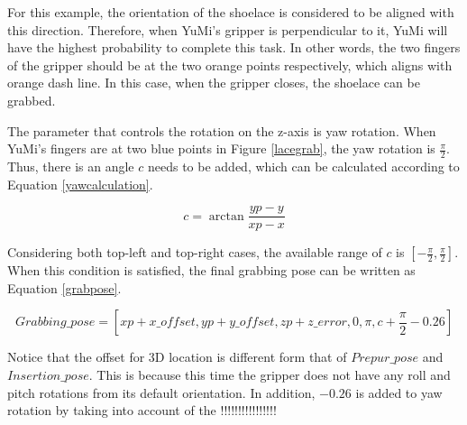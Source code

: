 For this example, the orientation of the shoelace is considered to be aligned with this direction. Therefore, when YuMi's gripper is perpendicular to it, YuMi will have the highest probability to complete this task. In other words, the two fingers of the gripper should be at the two orange points respectively, which aligns with orange dash line. In this case, when the gripper closes, the shoelace can be grabbed. 

The parameter that controls the rotation on the z-axis is yaw rotation. When YuMi's fingers are at two blue points in Figure \ref{lacegrab}, the yaw rotation is $\frac{\pi}{2}$. Thus, there is an angle $c$ needs to be added, which can be calculated according to Equation \ref{yawcalculation}.

\begin{equation}
c = \arctan \frac{yp - y}{xp - x}
\label{yawcalculation}
\end{equation}

Considering both top-left and top-right cases, the available range of $c$ is $[-\frac{\pi}{2}, \frac{\pi}{2}]$. When this condition is satisfied, the final grabbing pose can be written as Equation \ref{grabpose}.

\begin{equation}
Grabbing\_pose = [xp + x\_offset, yp + y\_offset, zp + z\_error, 0, \pi, c + \frac{\pi}{2} - 0.26]
\label{grabpose}
\end{equation}

Notice that the offset for 3D location is different form that of $Prepur\_pose$ and $Insertion\_pose$. This is because this time the gripper does not have any roll and pitch rotations from its default orientation. In addition, $-0.26$ is added to yaw rotation by taking into account of the !!!!!!!!!!!!!!!!